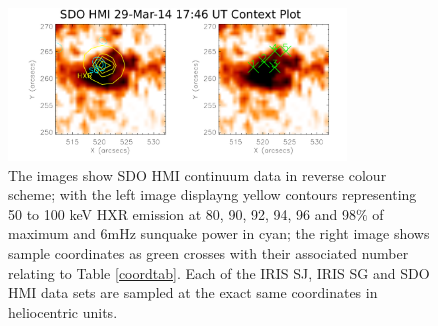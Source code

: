 \begin{figure}[H]
  \begin{center}
  \includegraphics[width=0.8\textwidth]{29-Mar-14-HMI-Sunquake-Context-Plot}
  \end{center}
  \caption{The images show SDO HMI continuum data in reverse colour scheme; with the left image displayng yellow contours representing 50 to 100 keV HXR emission at 80, 90, 92, 94, 96 and 98$\%$ of maximum and 6mHz sunquake power in cyan; the right image shows sample coordinates as green crosses with their associated number relating to Table \ref{coordtab}. Each of the IRIS SJ, IRIS SG and SDO HMI data sets are sampled at the exact same coordinates in heliocentric units.}\label{hmicontext}
\end{figure}


